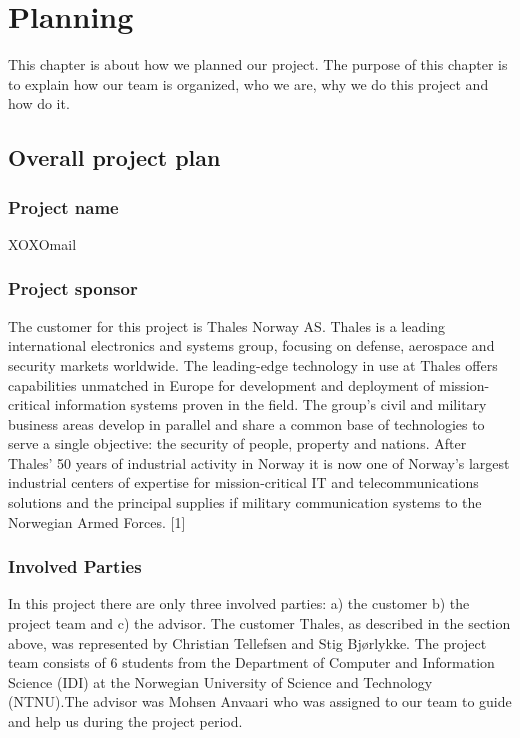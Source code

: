 \chapter{Planning}

This chapter is about how we planned our project. The purpose of this chapter is to explain how our team is organized, who we are, why we do this project and how do it.

\section{Overall project plan}

\subsection{Project name}
XOXOmail

\subsection{Project sponsor}

The customer for this project is Thales Norway AS. Thales is a leading international electronics and systems group, focusing on defense, aerospace and security markets worldwide. The leading-edge technology in use at Thales offers capabilities unmatched in Europe for development and deployment of mission-critical information systems proven in the field. The group’s civil and military business areas develop in parallel and share a common base of technologies to serve a single objective: the security of people, property and nations.
\newline
\newline
After Thales’ 50 years of industrial activity in Norway it is now one of Norway’s largest industrial centers of expertise for mission-critical IT and telecommunications solutions and the principal supplies if military communication systems to the Norwegian Armed Forces. [1]

\subsection{Involved Parties}

In this project there are only three involved parties: a) the customer b) the project team and c) the advisor. The customer Thales, as described in the section above, was represented by Christian Tellefsen and Stig Bjørlykke. The project team consists of 6 students from the Department of Computer and Information Science (IDI) at the Norwegian University of Science and Technology (NTNU).The advisor was Mohsen Anvaari who was assigned to our team to guide and help us during the project period.

